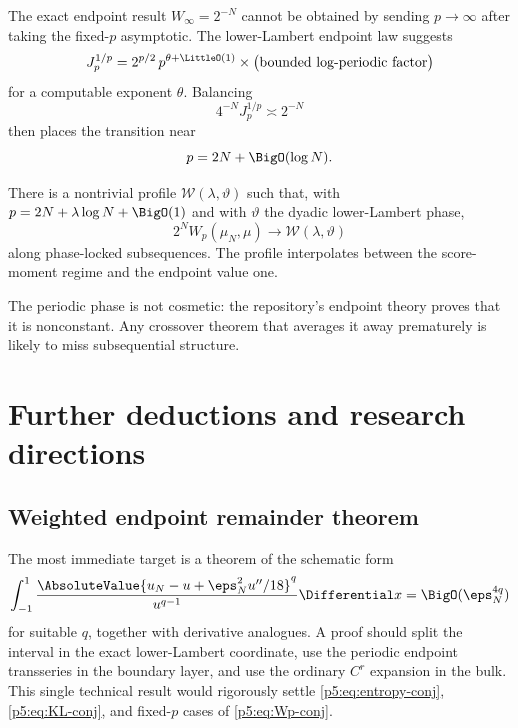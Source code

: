 \documentclass[11pt,oneside]{article}
\numberwithin{equation}{section}
\theoremstyle{definition}
\theoremstyle{remark}
\begin{document}
The exact endpoint result $W_\infty=2^{-N}$ cannot be obtained by sending $p\to\infty$ after taking the fixed-$p$ asymptotic.  The lower-Lambert endpoint law suggests
\begin{equation}
 J_p^{1/p}=2^{p/2}\,p^{\theta+\LittleO(1)}
 \times\bigl(\text{bounded log-periodic factor}\bigr)
 \label{p5:eq:Jp-growth}
\end{equation}
for a computable exponent $\theta$.  Balancing
\[
 4^{-N}J_p^{1/p}\asymp2^{-N}
\]
then places the transition near
\begin{equation}
 p=2N+\BigO(\log N).
 \label{p5:eq:crossover}
\end{equation}

\begin{conjecture}
There is a nontrivial profile $\mathcal W(\lambda,\vartheta)$ such that, with
$p=2N+\lambda\log N+\BigO(1)$ and with $\vartheta$ the dyadic lower-Lambert phase,
\begin{equation}
 2^N W_p(\mu_N,\mu)\longrightarrow\mathcal W(\lambda,\vartheta)
 \label{p5:eq:crossover-profile}
\end{equation}
along phase-locked subsequences.  The profile interpolates between the score-moment regime and the endpoint value one.
\end{conjecture}

The periodic phase is not cosmetic: the repository's endpoint theory proves that it is nonconstant.  Any crossover theorem that averages it away prematurely is likely to miss subsequential structure.

\section{Further deductions and research directions}
\label{p5:sec:future}

\subsection{Weighted endpoint remainder theorem}

The most immediate target is a theorem of the schematic form
\begin{equation}
 \int_{-1}^{1}
 \frac{\AbsoluteValue{u_N-u+\eps_N^2u''/18}^q}{u^{q-1}}
 \Differential x
 =\BigO(\eps_N^{4q})
 \label{p5:eq:weighted-remainder-goal}
\end{equation}
for suitable $q$, together with derivative analogues.  A proof should split the interval in the exact lower-Lambert coordinate, use the periodic endpoint transseries in the boundary layer, and use the ordinary $C^r$ expansion in the bulk.  This single technical result would rigorously settle \eqref{p5:eq:entropy-conj}, \eqref{p5:eq:KL-conj}, and fixed-$p$ cases of \eqref{p5:eq:Wp-conj}.
\end{document}
